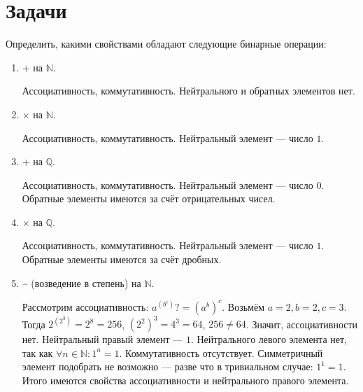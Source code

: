 \section*{Задачи}

\begin{task}\label{Algebra:OperationProperties}
    Определить, какими свойствами обладают следующие бинарные операции:
    \begin{enumerate}
        \item $+$ на $\mathbb{N}$.\\
        \begin{solution} 
            Ассоциативность, коммутативность. Нейтрального и обратных элементов нет. 
        \end{solution}

        \item $\times$ на $\mathbb{N}$.\\
        \begin{solution}
            Ассоциативность, коммутативность. Нейтральный элемент --- число $1$.
        \end{solution}

        \item $+$ на $\mathbb{Q}$.\\
        \begin{solution}
            Ассоциативность, коммутативность. Нейтральный элемент --- число $0$. Обратные элементы имеются за счёт отрицательных чисел.
        \end{solution}

        \item $\times$ на $\mathbb{Q}$.\\
        \begin{solution}
            Ассоциативность, коммутативность. Нейтральный элемент --- число $1$. Обратные элементы имеются за счёт дробных.
        \end{solution}

        \item $\hat{\;\;}$ (возведение в степень) на $\mathbb{N}$.\\
        \begin{solution}
            Рассмотрим ассоциативность: $a^{(b^c)} ?= (a^b)^c$. Возьмём $a=2, b=2, c=3$. Тогда $2^{(2^3)}=2^{8}=256$, $(2^2)^3=4^3=64$, $256 \ne 64$. Значит, ассоциативности нет. Нейтральный правый элемент --- $1$. Нейтрального левого элемента нет, так как $\forall n \in \mathbb{N}: 1^n=1$. Коммутативность отсутствует. Симметричный элемент подобрать не возможно --- разве что в тривиальном случае: $1^1=1$. Итого имеются свойства ассоциативности и нейтрального правого элемента.
        \end{solution}


\end{enumerate}
\end{task}
